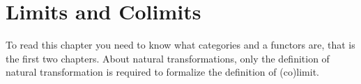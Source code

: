 
\chapter{Limits and Colimits}

To read this chapter you need to know what categories and a functors
are, that is the first two chapters. About natural transformations,
only the definition of natural transformation is required to formalize
the definition of (co)limit.

 




% 



